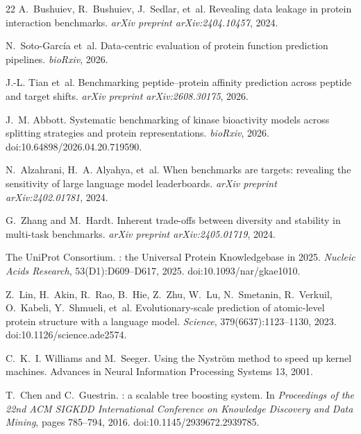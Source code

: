 \documentclass[11pt,a4paper]{article}
\begin{document}
\begin{thebibliography}{22}
A.~Bushuiev, R.~Bushuiev, J.~Sedlar, et~al.
\newblock Revealing data leakage in protein interaction benchmarks.
\newblock \emph{arXiv preprint arXiv:2404.10457}, 2024.

N.~Soto-Garc\'ia et~al.
\newblock Data-centric evaluation of protein function prediction pipelines.
\newblock \emph{bioRxiv}, 2026.

J.-L. Tian et~al.
\newblock Benchmarking peptide--protein affinity prediction across peptide and target
  shifts.
\newblock \emph{arXiv preprint arXiv:2608.30175}, 2026.

J.~M. Abbott.
\newblock Systematic benchmarking of kinase bioactivity models across splitting strategies
  and protein representations.
\newblock \emph{bioRxiv}, 2026.
\newblock doi:10.64898/2026.04.20.719590.

N.~Alzahrani, H.~A. Alyahya, et~al.
\newblock When benchmarks are targets: revealing the sensitivity of large language model
  leaderboards.
\newblock \emph{arXiv preprint arXiv:2402.01781}, 2024.

G.~Zhang and M.~Hardt.
\newblock Inherent trade-offs between diversity and stability in multi-task benchmarks.
\newblock \emph{arXiv preprint arXiv:2405.01719}, 2024.

{The UniProt Consortium}.
: the Universal Protein Knowledgebase in 2025.
\newblock \emph{Nucleic Acids Research}, 53(D1):D609--D617, 2025.
\newblock doi:10.1093/nar/gkae1010.

Z.~Lin, H.~Akin, R.~Rao, B.~Hie, Z.~Zhu, W.~Lu, N.~Smetanin, R.~Verkuil, O.~Kabeli,
  Y.~Shmueli, et~al.
\newblock Evolutionary-scale prediction of atomic-level protein structure with a language
  model.
\newblock \emph{Science}, 379(6637):1123--1130, 2023.
\newblock doi:10.1126/science.ade2574.

C.~K.~I. Williams and M.~Seeger.
\newblock Using the Nystr\"om method to speed up kernel machines.
\newblock Advances in Neural Information Processing Systems 13, 2001.

T.~Chen and C.~Guestrin.
: a scalable tree boosting system.
\newblock In \emph{Proceedings of the 22nd ACM SIGKDD International Conference on
  Knowledge Discovery and Data Mining}, pages 785--794, 2016.
\newblock doi:10.1145/2939672.2939785.


\end{thebibliography}
\end{document}
